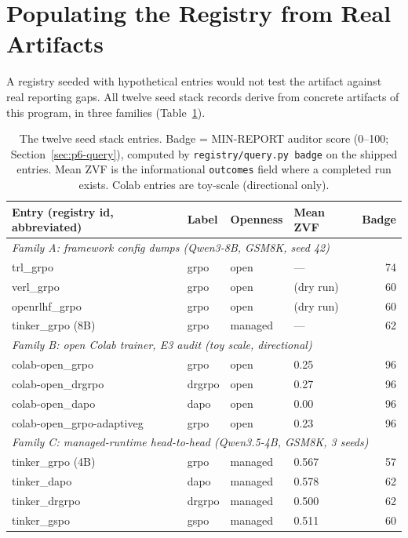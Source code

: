 \section{Populating the Registry from Real Artifacts}
\label{sec:p6-population}

A registry seeded with hypothetical entries would not test the artifact against
real reporting gaps. All twelve seed stack records derive from concrete
artifacts of this program, in three families (Table~\ref{tab:p6-entries}).

\begin{table}[t]
\centering
\caption{The twelve seed stack entries. Badge = MIN-REPORT auditor score
(0--100; Section~\ref{sec:p6-query}), computed by
\texttt{registry/query.py badge} on the shipped entries. Mean ZVF is the
informational \texttt{outcomes} field where a completed run exists. Colab
entries are toy-scale (directional only).}
\label{tab:p6-entries}
\small
\begin{tabular}{llllr}
\toprule
Entry (registry id, abbreviated) & Label & Openness & Mean ZVF & Badge \\
\midrule
\multicolumn{5}{l}{\emph{Family A: framework config dumps (Qwen3-8B, GSM8K, seed 42)}}\\
trl_grpo & grpo & open & --- & 74 \\
verl_grpo & grpo & open & (dry run) & 60 \\
openrlhf_grpo & grpo & open & (dry run) & 60 \\
tinker_grpo (8B) & grpo & managed & --- & 62 \\
\midrule
\multicolumn{5}{l}{\emph{Family B: open Colab trainer, E3 audit (toy scale, directional)}}\\
colab-open_grpo & grpo & open & 0.25 & 96 \\
colab-open_drgrpo & drgrpo & open & 0.27 & 96 \\
colab-open_dapo & dapo & open & 0.00 & 96 \\
colab-open_grpo-adaptiveg & grpo & open & 0.23 & 96 \\
\midrule
\multicolumn{5}{l}{\emph{Family C: managed-runtime head-to-head (Qwen3.5-4B, GSM8K, 3 seeds)}}\\
tinker_grpo (4B) & grpo & managed & 0.567 & 57 \\
tinker_dapo & dapo & managed & 0.578 & 62 \\
tinker_drgrpo & drgrpo & managed & 0.500 & 62 \\
tinker_gspo & gspo & managed & 0.511 & 60 \\
\bottomrule
\end{tabular}
\end{table}

